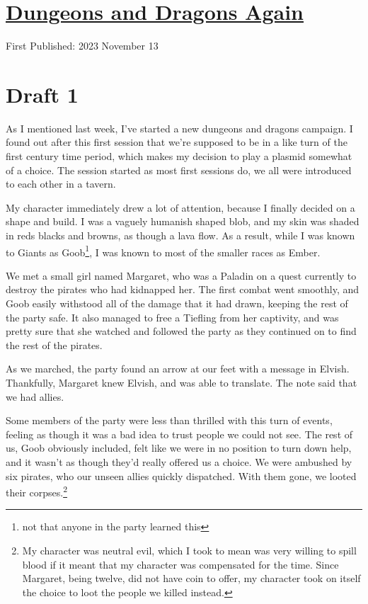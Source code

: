 \documentclass[12pt]{article}[titlepage]
\renewcommand{\,}{\textsuperscript{,}}
\begin{document}
\doublespacing
\section{\href{dungeons-dragons-6.html}{Dungeons and Dragons Again}}
First Published: 2023 November 13

\section{Draft 1}
As I mentioned last week, I've started a new dungeons and dragons campaign.
I found out after this first session that we're supposed to be in a like turn of the first century time period, which makes my decision to play a plasmid somewhat of a choice.
The session started as most first sessions do, we all were introduced to each other in a tavern.

My character immediately drew a lot of attention, because I finally decided on a shape and build.
I was a vaguely humanish shaped blob, and my skin was shaded in reds blacks and browns, as though a lava flow.
As a result, while I was known to Giants as Goob\footnote{not that anyone in the party learned this}, I was known to most of the smaller races as Ember.

We met a small girl named Margaret, who was a Paladin on a quest currently to destroy the pirates who had kidnapped her.
The first combat went smoothly, and Goob easily withstood all of the damage that it had drawn, keeping the rest of the party safe.
It also managed to free a Tiefling from her captivity, and was pretty sure that she watched and followed the party as they continued on to find the rest of the pirates.

As we marched, the party found an arrow at our feet with a message in Elvish.
Thankfully, Margaret knew Elvish, and was able to translate.
The note said that we had allies.

Some members of the party were less than thrilled with this turn of events, feeling as though it was a bad idea to trust people we could not see.
The rest of us, Goob obviously included, felt like we were in no position to turn down help, and it wasn't as though they'd really offered us a choice.
We were ambushed by six pirates, who our unseen allies quickly dispatched.
With them gone, we looted their corpses.\footnote{My character was neutral evil, which I took to mean was very willing to spill blood if it meant that my character was compensated for the time.
Since Margaret, being twelve, did not have coin to offer, my character took on itself the choice to loot the people we killed instead.}
\end{document}
